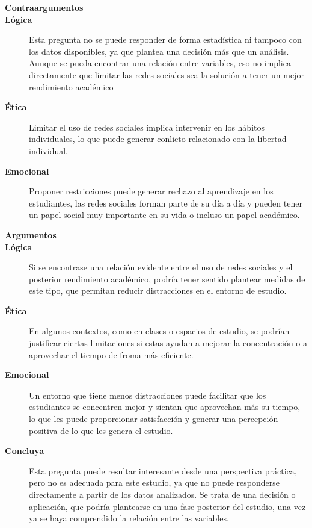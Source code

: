 \documentclass[12pt]{article}
\begin{document}
\begin{description}

\item[\textbf{Contraargumentos}]
\item[\textbf{Lógica}] Esta pregunta no se puede responder de forma estadística ni tampoco con los datos disponibles, ya que plantea una decisión más que un análisis. Aunque se pueda encontrar una relación entre variables, eso no implica directamente que limitar las redes sociales sea la solución a tener un mejor rendimiento académico
\item[\textbf{Ética}] Limitar el uso de redes sociales implica intervenir en los hábitos individuales, lo que puede generar conlicto relacionado con la libertad individual.
\item[\textbf{Emocional}] Proponer restricciones puede generar rechazo al aprendizaje en los estudiantes, las redes sociales forman parte de su día a día y pueden tener un papel social muy importante en su vida o incluso un papel académico.

\item[\textbf{Argumentos}]
\item[\textbf{Lógica}] Si se encontrase una relación evidente entre el uso de redes sociales y el posterior rendimiento académico, podría tener sentido plantear medidas de este tipo, que permitan reducir distracciones en el entorno de estudio.
\item[\textbf{Ética}] En algunos contextos, como en clases o espacios de estudio, se podrían justificar ciertas limitaciones si estas ayudan a mejorar la concentración o a aprovechar el tiempo de froma más eficiente.
\item[\textbf{Emocional}] Un entorno que tiene menos distracciones puede facilitar que los estudiantes se concentren mejor y sientan que aprovechan más su tiempo, lo que les puede proporcionar satisfacción y generar una percepción positiva de lo que les genera el estudio.
\item[\textbf{Concluya}] Esta pregunta puede resultar interesante desde una perspectiva práctica, pero no es adecuada para este estudio, ya que no puede responderse directamente a partir de los datos analizados. Se trata de una decisión o aplicación, que podría plantearse en una fase posterior del estudio, una vez ya se haya comprendido la relación entre las variables.

\end{description}
\end{document}
